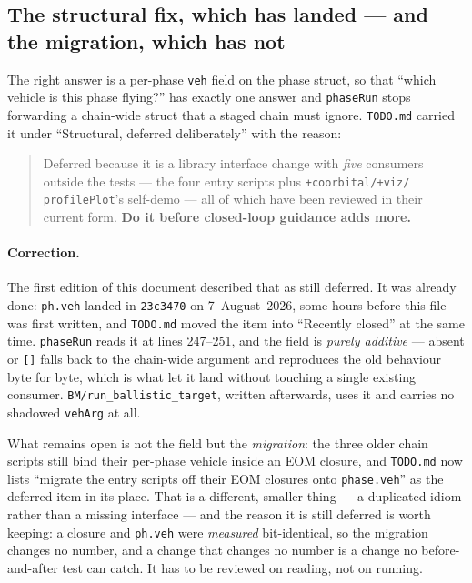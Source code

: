 \documentclass[11pt]{article}
\newcommand{\code}[1]{\texttt{#1}}
\begin{document}
\subsection{The structural fix, which has landed --- and the migration, which
has not}

The right answer is a per-phase \code{veh} field on the phase struct, so that
``which vehicle is this phase flying?'' has exactly one answer and
\code{phaseRun} stops forwarding a chain-wide struct that a staged chain must
ignore. \code{TODO.md} carried it under ``Structural, deferred deliberately''
with the reason:

\begin{quote}
Deferred because it is a library interface change with \emph{five} consumers
outside the tests --- the four entry scripts plus \code{+coorbital/+viz/}
\code{profilePlot}'s self-demo --- all of which have been reviewed in their
current form. \textbf{Do it before closed-loop guidance adds more.}
\end{quote}

\paragraph{Correction.} The first edition of this document described that as
still deferred. It was already done: \code{ph.veh} landed in \code{23c3470} on
7~August~2026, some hours before this file was first written, and
\code{TODO.md} moved the item into ``Recently closed'' at the same time.
\code{phaseRun} reads it at lines 247--251, and the field is \emph{purely
additive} --- absent or \code{[]} falls back to the chain-wide argument and
reproduces the old behaviour byte for byte, which is what let it land without
touching a single existing consumer. \code{BM/run\_ballistic\_target}, written
afterwards, uses it and carries no shadowed \code{vehArg} at all.

What remains open is not the field but the \emph{migration}: the three older
chain scripts still bind their per-phase vehicle inside an EOM closure, and
\code{TODO.md} now lists ``migrate the entry scripts off their EOM closures
onto \code{phase.veh}'' as the deferred item in its place. That is a
different, smaller thing --- a duplicated idiom rather than a missing
interface --- and the reason it is still deferred is worth keeping: a closure
and \code{ph.veh} were \emph{measured} bit-identical, so the migration changes
no number, and a change that changes no number is a change no
before-and-after test can catch. It has to be reviewed on reading, not on
running.
\end{document}
